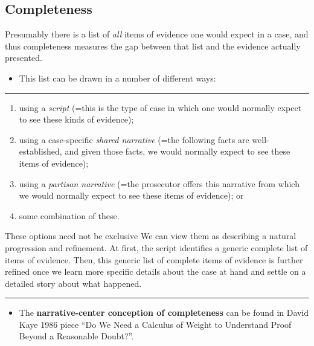 \documentclass[
  10pt,
  dvipsnames,enabledeprecatedfontcommands]{scrartcl}
\providecommand{\tightlist}{%
  \setlength{\itemsep}{0pt}\setlength{\parskip}{0pt}}
\begin{document}
\hypertarget{completeness}{%
\subsection{Completeness}\label{completeness}}

Presumably there is a list of \emph{all} items of evidence one would
expect in a case, and thus completeness measures the gap between that
list and the evidence actually presented.

\begin{itemize}
\tightlist
\item
  This list can be drawn in a number of different ways:
\end{itemize}

\begin{center}\rule{0.5\linewidth}{0.5pt}\end{center}

\begin{enumerate}
\def\labelenumi{(\alph{enumi})}
\item
  using a \emph{script} (=this is the type of case in which one would
  normally expect to see these kinds of evidence);
\item
  using a case-specific \emph{shared narrative} (=the following facts
  are well-established, and given those facts, we would normally expect
  to see these items of evidence);
\item
  using a \emph{partisan narrative} (=the prosecutor offers this
  narrative from which we would normally expect to see these items of
  evidence); or
\item
  some combination of these.
\end{enumerate}

These options need not be exclusive We can view them as describing a
natural progression and refinement. At first, the script identifies a
generic complete list of items of evidence. Then, this generic list of
complete items of evidence is further refined once we learn more
specific details about the case at hand and settle on a detailed story
about what happened.

\begin{center}\rule{0.5\linewidth}{0.5pt}\end{center}

\begin{itemize}
\tightlist
\item
  The \textbf{narrative-center conception of completeness} can be found
  in David Kaye 1986 piece ``Do We Need a Calculus of Weight to
  Understand Proof Beyond a Reasonable Doubt?''.
\end{itemize}
\end{document}
